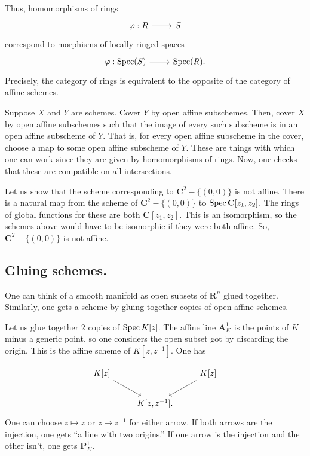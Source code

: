 \documentclass [11 pt, oneside] {article}
\begin{document}
Thus, homomorphisms of rings 
\[
\begin{tikzcd}
\varphi:R\ar[r]&S
\end{tikzcd}
\]
correspond to morphisms of locally ringed spaces 
\[
\begin{tikzcd}
\varphi:\Spec(S)\ar[r]&\Spec(R).
\end{tikzcd}
\] 
Precisely, the category of rings is equivalent to the opposite of the category of affine schemes.

Suppose $X$ and $Y$ are schemes. Cover $Y$ by open affine subschemes. Then, cover $X$ by open affine subschemes such that the image of every such subscheme is in an open affine subscheme of $Y$. That is, for every open affine subscheme in the cover, choose a map to some open affine subscheme of $Y$. These are things with which one can work since they are given by homomorphisms of rings. Now, one checks that these are compatible on all intersections.

\begin{example}[ ]\label{}\text{}
Let us show that the scheme corresponding to $\mathbf{C}^2 - \{(0,0)\}$ is not affine. There is a natural map from the scheme of $\mathbf{C}^2-\{(0,0)\}$ to $\operatorname{Spec} \mathbf{C}[z_1,z_2]$. The rings of global functions for these are both $\mathbf{C}[z_1,z_2]$. This is an isomorphism, so the schemes above would have to be isomorphic if they were both affine. So, $\mathbf{C}^2-\{(0,0)\}$ is not affine. 
\end{example}

\subsection{Gluing schemes.}
One can think of a smooth manifold as open subsets of $\mathbf{R}^n$ glued together. Similarly, one gets a scheme by gluing together copies of open affine schemes.

\begin{example}[ ]\label{gluing_1}\text{}
Let us glue together $2$ copies of $\operatorname{Spec} K[z]$. The affine line $\mathbf{A}^1_K$ is the points of $K$ minus a generic point, so one considers the open subset got by discarding the origin. This is the affine scheme of $K[z,z^{-1}]$. One has

\[
\begin{tikzcd}
	K[z]\ar[dr] && K[z] \ar[dl]\\
		    &K[z,z^{-1}].
\end{tikzcd}
\]
One can choose $z\longmapsto z$ or $z\longmapsto z^{-1}$ for either arrow. If both arrows are the injection, one gets ``a line with two origins.'' If one arrow is the injection and the other isn't, one gets $\mathbf{P}^1_K$.
\end{example}
\end{document}
